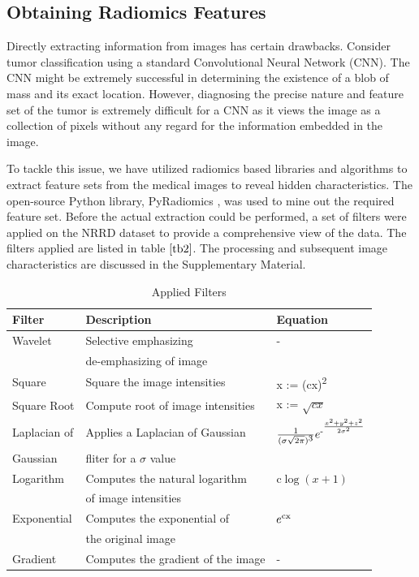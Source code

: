 \documentclass[final,1p,times,twocolumn]{elsarticle}
\newcommand\sufr[3][0pt]{$\rule{0pt}{\dimexpr#1+1.4ex\relax}^\frac{#2}{#3}$}
\begin{document}

\subsection{Obtaining Radiomics Features}

Directly extracting information from images has certain drawbacks. Consider tumor classification using a standard Convolutional Neural Network (CNN). The CNN might be extremely successful in determining the existence of a blob of mass and its exact location. However, diagnosing the precise nature and feature set of the tumor is extremely difficult for a CNN as it views the image as a collection of pixels without any regard for the information embedded in the image.

To tackle this issue, we have utilized radiomics based libraries and algorithms to extract feature sets from the medical images to reveal hidden characteristics. The open-source Python library, PyRadiomics \cite{14}, was used to mine out the required feature set. Before the actual extraction could be performed, a set of filters were applied on the NRRD dataset to provide a comprehensive view of the data. The filters applied are listed in table $\ref{tb2}$. The processing and subsequent image characteristics are discussed in the Supplementary Material.

\begin{table}[!b]
\scriptsize
\centering
\caption{Applied Filters}
\label{tb2}
\begin{tabular}{| l | l | l |}
\hline
\textbf{Filter} & \textbf{Description} & \textbf{Equation}\\
\hline
Wavelet & Selective emphasizing  & -\\
&de-emphasizing of image&\\
\hline
Square & Square the image intensities & x := (cx)\textsuperscript{2}\\
\hline
Square Root & Compute root of image intensities & x := $\sqrt{cx}$\\
\hline
Laplacian of & Applies a Laplacian of Gaussian & $\frac{1}{(\sigma\sqrt{2\pi})\textsuperscript{3}}e\textsuperscript{-\sufr{x\textsuperscript{2}+y\textsuperscript{2}+z\textsuperscript{2}}{2\sigma\textsuperscript{2}}}$\\
Gaussian &fliter for a $\sigma$ value&\\
\hline
Logarithm & Computes the natural logarithm& c$\log(x+1)$\\
& of image intensities &\\
\hline
Exponential & Computes the exponential of & $e\textsuperscript{cx}$\\
&the original image &\\
\hline
Gradient & Computes the gradient of the image & -\\
\hline
\end{tabular}
\end{table}
\end{document}
